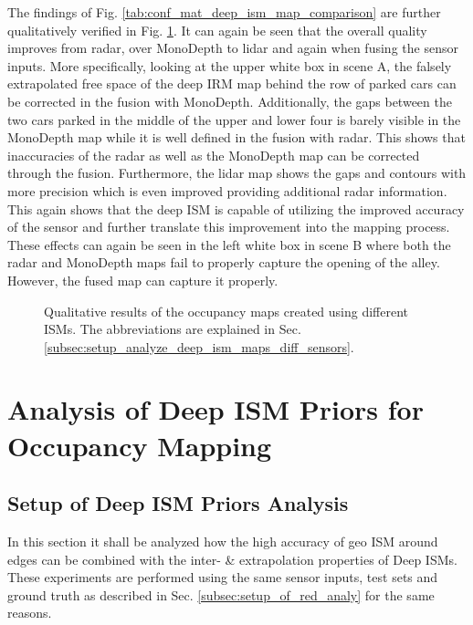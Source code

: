 The findings of Fig. \ref{tab:conf_mat_deep_ism_map_comparison} are further qualitatively verified in Fig. \ref{fig:comparison_of_maps_diff_sens}. It can again be seen that the overall quality improves from radar, over MonoDepth to lidar and again when fusing the sensor inputs. More specifically, looking at the upper white box in scene A, the falsely extrapolated free space of the deep IRM map behind the row of parked cars can be corrected in the fusion with MonoDepth. Additionally, the gaps between the two cars parked in the middle of the upper and lower four is barely visible in the MonoDepth map while it is well defined in the fusion with radar. This shows that inaccuracies of the radar as well as the MonoDepth map can be corrected through the fusion. Furthermore, the lidar map shows the gaps and contours with more precision which is even improved providing additional radar information. This again shows that the deep ISM is capable of utilizing the improved accuracy of the sensor and further translate this improvement into the mapping process. These effects can again be seen in the left white box in scene B where both the radar and MonoDepth maps fail to properly capture the opening of the alley. However, the fused map can capture it properly.
\begin{figure}[H]
	\begin{center}
		\caption{\label{fig:comparison_of_maps_diff_sens}Qualitative results of the occupancy maps created using different ISMs. The abbreviations are explained in Sec. \ref{subsec:setup_analyze_deep_ism_maps_diff_sensors}.}
	\end{center}
\end{figure}
%
\section{Analysis of Deep ISM Priors for Occupancy Mapping}
\label{sec:exp_analyze_prior_properties}
%
\subsection{Setup of Deep ISM Priors Analysis}
\label{subsec:setup_of_prior_analy}
In this section it shall be analyzed how the high accuracy of geo ISM around edges can be combined with the inter- \& extrapolation properties of Deep ISMs. These experiments are performed using the same sensor inputs, test sets and ground truth as described in Sec. \ref{subsec:setup_of_red_analy} for the same reasons. 

